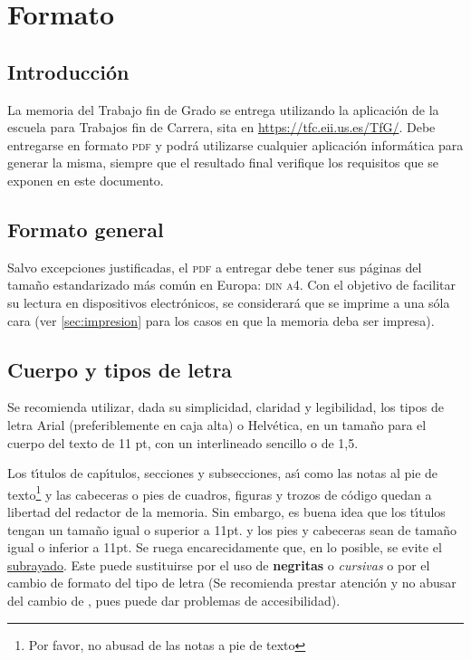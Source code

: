 
\chapter{Formato}\label{cap1}
\makeatletter
{}
\makeatother

\FloatBarrier
\section{Introducci\'on}\label{sec:intro}

La memoria del Trabajo fin de Grado se entrega utilizando la aplicaci\'on de la escuela para 
Trabajos fin de Carrera, sita en 
\url{https://tfc.eii.us.es/TfG/}. Debe entregarse en formato \textsc{pdf} y podr\'a utilizarse
cualquier aplicaci\'on inform\'atica para generar la misma, siempre que el resultado
final verifique los requisitos
que se exponen en este documento.


\FloatBarrier
\section{Formato general}\label{sec:general}

Salvo excepciones justificadas, el \textsc{pdf} 
a entregar debe tener sus p\'aginas del tama{\~n}o
estandarizado m\'as com\'un en Europa: \textsc{din a4}. Con el objetivo de facilitar 
su lectura en dispositivos electr\'onicos, se considerará que
se imprime a una s\'ola cara (ver \ref{sec:impresion} para los casos en que la memoria deba ser impresa).


\FloatBarrier
\section{Cuerpo y tipos de letra}\label{sec:letra}

Se recomienda utilizar, dada su simplicidad, claridad y legibilidad, los tipos de letra
Arial (preferiblemente en caja alta) o Helv\'etica, en un tamaño para el cuerpo del texto de 11 pt,
con un interlineado sencillo o de 1,5.

Los t{\'\i}tulos de cap{\'\i}tulos, secciones y subsecciones, as{\'\i} como las notas al pie de texto\footnote{Por favor, no abusad de las notas a pie de texto}
y las cabeceras o pies de cuadros, figuras y trozos de c\'odigo quedan a libertad del redactor de la memoria.
Sin embargo, es buena idea que los t{\'\i}tulos tengan un tamaño igual o superior a 11pt. y los pies y cabeceras
sean de tama{\~n}o igual o inferior a 11pt. Se ruega encarecidamente que, en lo posible, se evite el \underline{subrayado}.
Este puede sustituirse por el uso de \textbf{negritas} o \textit{cursivas} o por el cambio de formato del tipo de letra
(Se recomienda prestar atenci\'on y no abusar del cambio de {\color{blue}{color}}, 
pues puede dar problemas de accesibilidad).

